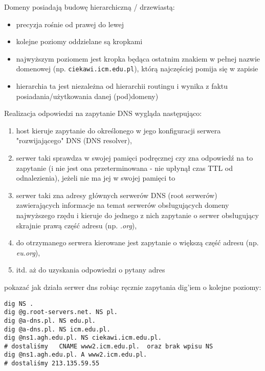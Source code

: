 Domeny posiadają budowę hierarchiczną / drzewiastą:
\begin{itemize}
	\item precyzja rośnie od prawej do lewej
	\item kolejne poziomy oddzielane są kropkami
	\item najwyższym poziomem jest kropka będąca ostatnim znakiem w pełnej nazwie domenowej (np. \texttt{ciekawi.icm.edu.pl\textbf{\color{red}{.}}}), którą najczęściej pomija się w zapisie
	\item hierarchia ta jest niezależna od hierarchii routingu i wynika z faktu posiadania/użytkowania danej (pod)domeny)
\end{itemize}
Realizacja odpowiedzi na zapytanie DNS wygląda następująco:
\begin{enumerate}
	\item host kieruje zapytanie do określonego w jego konfiguracji serwera "rozwijającego" DNS (DNS resolver),
	\item serwer taki sprawdza w swojej pamięci podręcznej czy zna odpowiedź na to zapytanie (i nie jest ona przeterminowana - nie upłynął czas TTL od odnalezienia), jeżeli nie ma jej w swojej pamięci to
	\item serwer taki zna adresy głównych serwerów DNS (root serwerów) zawierających informacje na temat serwerów obsługujących domeny najwyższego rzędu i kieruje do jednego z nich zapytanie o serwer obsługujący skrajnie prawą część adresu (np. \textit{.org}),
	\item do otrzymanego serwera kierowane jest zapytanie o większą część adresu (np. \textit{eu.org}),
	\item itd. aż do uzyskania odpowiedzi o pytany adres
\end{enumerate}

\begin{teacherOnly}
pokazać jak działa serwer dns robiąc ręcznie zapytania dig'iem o kolejne poziomy:

\begin{Verbatim}
dig NS .
dig @g.root-servers.net. NS pl.
dig @a-dns.pl. NS edu.pl.
dig @a-dns.pl. NS icm.edu.pl.
dig @ns1.agh.edu.pl. NS ciekawi.icm.edu.pl.
# dostaliśmy   CNAME www2.icm.edu.pl.  oraz brak wpisu NS
dig @ns1.agh.edu.pl. A www2.icm.edu.pl.
# dostaliśmy 213.135.59.55
\end{Verbatim}
\end{teacherOnly}



